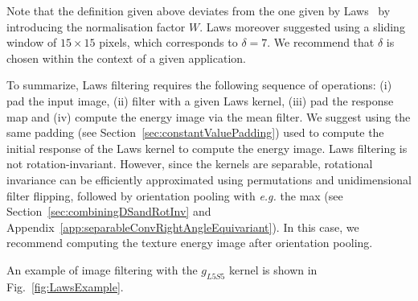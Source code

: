 \documentclass[fleqn,a4paper,oneside,openany]{book}
\begin{document}
Note that the definition given above deviates from the one given by Laws~\cite{Law1980} by introducing the normalisation factor \(W\).
Laws moreover suggested using a sliding window of $15\times 15$ pixels, which corresponds to $\delta=7$.
We recommend that $\delta$ is chosen within the context of a given application.

To summarize, Laws filtering requires the following sequence of operations: (i) pad the input image, (ii) filter with a given Laws kernel, (iii) pad the response map and (iv) compute the energy image via the mean filter.
We suggest using the same padding (see Section~\ref{sec:constantValuePadding}) used to compute the initial response of the Laws kernel to compute the energy image.
Laws filtering is not rotation-invariant.
However, since the kernels are separable, rotational invariance can be efficiently approximated using permutations and unidimensional filter flipping, followed by orientation pooling with \textit{e.g.} the max (see Section~\ref{sec:combiningDSandRotInv} and Appendix~\ref{app:separableConvRightAngleEquivariant}).
In this case, we recommend computing the texture energy image after orientation pooling.

An example of image filtering with the $g_{L5S5}$ kernel is shown in Fig.~\ref{fig:LawsExample}.
\end{document}
